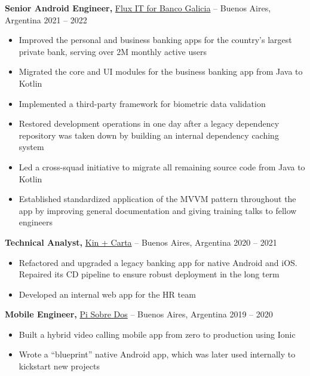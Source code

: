 \documentclass[11pt]{article}       %
\begin{document}
\vspace{3pt}

\textbf{Senior Android Engineer,} \href{https://fluxitsoft.com/}{Flux IT for Banco Galicia} -- Buenos Aires, Argentina \hfill 2021 -- 2022 \\
\vspace{-6pt}
\begin{itemize}
  \item Improved the personal and business banking apps for the country's largest private bank, serving over 2M monthly active users
  \item Migrated the core and UI modules for the business banking app from Java to Kotlin
  \item Implemented a third-party framework for biometric data validation
  \item Restored development operations in one day after a legacy dependency repository was taken down by building an internal dependency caching system
  \item Led a cross-squad initiative to migrate all remaining source code from Java to Kotlin
  \item Established standardized application of the MVVM pattern throughout the app by improving general documentation and giving training talks to fellow engineers
\end{itemize}

\vspace{3pt}

\textbf{Technical Analyst,} \href{http://www.kinandcarta.com/}{Kin + Carta} -- Buenos Aires, Argentina \hfill 2020 -- 2021 \\
\vspace{-6pt}
\begin{itemize}
  \item Refactored and upgraded a legacy banking app for native Android and iOS. Repaired its CD pipeline to ensure robust deployment in the long term
  \item Developed an internal web app for the HR team
\end{itemize}

\vspace{3pt}

\textbf{Mobile Engineer,} \href{https://pisobredos.com/}{Pi Sobre Dos} -- Buenos Aires, Argentina \hfill 2019 -- 2020 \\
\vspace{-6pt}
\begin{itemize}
  \item Built a hybrid video calling mobile app from zero to production using Ionic
  \item Wrote a “blueprint” native Android app, which was later used internally to kickstart new projects
\end{itemize}
\end{document}

